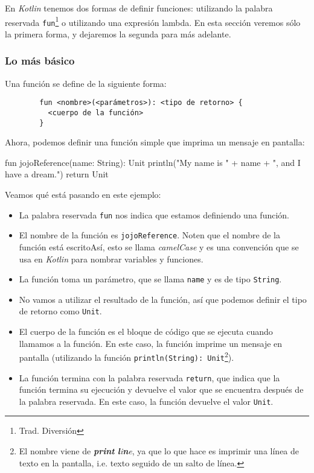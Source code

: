     En \textit{Kotlin} tenemos dos formas de definir funciones: utilizando la palabra reservada
    \texttt{fun}\footnote{Trad. Diversión} o utilizando una expresión lambda.
    En esta sección veremos sólo la primera forma, y dejaremos la segunda para más adelante.
    
    \subsubsection{Lo más básico}
      Una función se define de la siguiente forma:

      \begin{verbatim}
        fun <nombre>(<parámetros>): <tipo de retorno> {
          <cuerpo de la función>
        }
      \end{verbatim}

      Ahora, podemos definir una función simple que imprima un mensaje en pantalla:

      \begin{kotlin}
        fun jojoReference(name: String): Unit {
          println("My name is " + name + ", and I have a dream.")
          return Unit
        }
      \end{kotlin}
      
      Veamos qué está pasando en este ejemplo:

      \begin{itemize}
        \item La palabra reservada \texttt{fun} nos indica que estamos definiendo una función.
        \item El nombre de la función es \texttt{jojoReference}.
          Noten que el nombre de la función está escritoAsí, esto se llama \textit{camelCase} y es
          una convención que se usa en \textit{Kotlin} para nombrar variables y funciones.
        \item La función toma un parámetro, que se llama \texttt{name} y es de tipo \texttt{String}.
        \item No vamos a utilizar el resultado de la función, así que podemos definir el tipo de 
          retorno como \texttt{Unit}.
        \item El cuerpo de la función es el bloque de código que se ejecuta cuando llamamos a la
          función.
          En este caso, la función imprime un mensaje en pantalla (utilizando la función 
          \texttt{println(String): Unit}\footnote{El nombre viene de \textit{\textbf{print} 
          \textbf{l}i\textbf{n}e}, ya que lo que hace es imprimir una línea de texto en la pantalla, 
          i.e. texto seguido de un salto de línea.}).
        \item La función termina con la palabra reservada \texttt{return}, que indica que la función
          termina su ejecución y devuelve el valor que se encuentra después de la palabra reservada.
          En este caso, la función devuelve el valor \texttt{Unit}.   
      \end{itemize}

